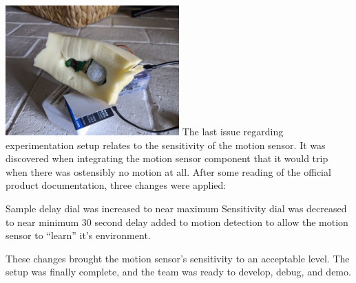 \documentclass[11pt,twocolumn]{article}
\begin{document}
{ \includegraphics[width=0.5\textwidth]{Picture1.png}
	The last issue regarding experimentation setup relates to the sensitivity of the motion sensor. It was discovered when integrating the motion sensor component that it would trip when there was ostensibly no motion at all. After some reading of the official product documentation, three changes were applied:

Sample delay dial was increased to near maximum
Sensitivity dial was decreased to near minimum
30 second delay added to motion detection to allow the motion sensor to “learn” it’s environment.

These changes brought the motion sensor’s sensitivity to an acceptable level. The setup was finally complete, and the team was ready to develop, debug, and demo.}
\end{document}
